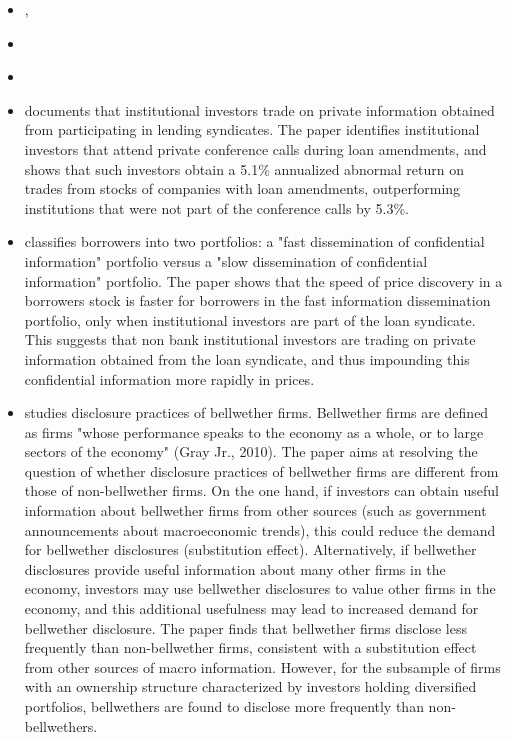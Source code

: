 \documentclass[english, 3p]{elsarticle}
\begin{document}
\begin{itemize}
	
	\item \cite[\textit{The New York Times}]{NYTOct2006}, \cite[\textit{The Wall Street Journal}]{WSJ2010}
	\item \cite{Bushman2014}
	\item \cite{Massoud2011}
	
	\item \cite{Ivashina2011a} documents that institutional investors trade on private information obtained from participating in lending syndicates. The paper identifies institutional investors that attend private conference calls during loan amendments, and shows that such investors obtain a 5.1\% annualized abnormal return on trades from stocks of companies with loan amendments, outperforming institutions that were not part of the conference calls by 5.3\%.
	
	\item \cite{Bushman2010} classifies borrowers into two portfolios: a "fast dissemination of confidential information" portfolio versus a "slow dissemination of confidential information" portfolio. The paper shows that the speed of price discovery in a borrowers stock is faster for borrowers in the fast information dissemination portfolio, only when institutional investors are part of the loan syndicate. This suggests that non bank institutional investors are trading on private information obtained from the loan syndicate, and thus impounding this confidential information more rapidly in prices.
	
	\item \cite{Tseng2014W} studies disclosure practices of bellwether firms. Bellwether firms are defined as firms "whose performance speaks to the economy as a whole, or to large sectors of the economy" (Gray Jr., 2010). The paper aims at resolving the question of whether disclosure practices of bellwether firms are different from those of non-bellwether firms. On the one hand, if investors can obtain useful information about bellwether firms from other sources (such as government announcements about macroeconomic trends), this could reduce the demand for bellwether disclosures (substitution effect). Alternatively, if bellwether disclosures provide useful information about many other firms in the economy, investors may use bellwether disclosures to value other firms in the economy, and this additional usefulness may lead to increased demand for bellwether disclosure. The paper finds that bellwether firms disclose less frequently than non-bellwether firms, consistent with a substitution effect from other sources of macro information. However, for the subsample of firms with an ownership structure characterized by investors holding diversified portfolios, bellwethers are found to disclose more frequently than non-bellwethers.  	
\end{itemize}
\end{document}
